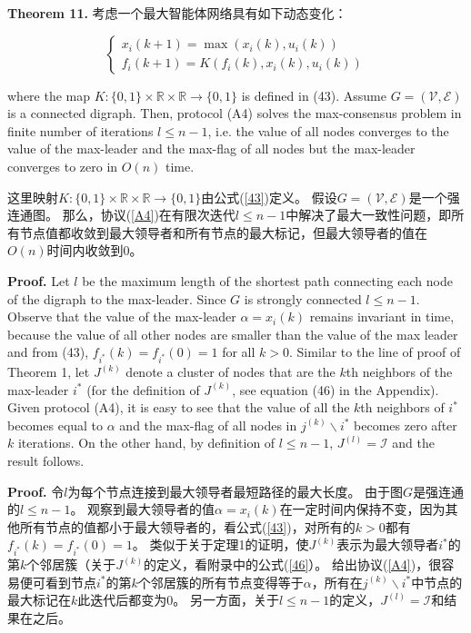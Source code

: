 \documentclass{article}
\begin{document}
\noindent\textbf{Theorem 11.} 考虑一个最大智能体网络具有如下动态变化：

\begin{equation}
    \tag{44}
    \label{44}
    \left\{
        \begin{matrix}
            x_i(k+1) = \max(x_i(k),u_i(k))\\
            f_i(k+1) = K(f_i(k),x_i(k),u_i(k))
        \end{matrix}
    \right.
\end{equation}

{\color[gray]{0.5}
\noindent where the map $K:\{0,1\}\times \mathbb{R}\times\mathbb{R}\rightarrow\{0,1\}$ is deﬁned in (43). 
Assume $G=(\mathcal{V},\mathcal{E})$ is a connected digraph. 
Then, protocol (A4) solves the max-consensus problem in finite number of iterations $l\le n-1$, i.e. the value of all nodes converges to the value of the max-leader and the max-flag of all nodes but the max-leader converges to zero in $O(n)$ time. 
}

\noindent 这里映射$K:\{0,1\}\times \mathbb{R}\times\mathbb{R}\rightarrow\{0,1\}$由公式(\ref{43})定义。
假设$G=(\mathcal{V},\mathcal{E})$是一个强连通图。
那么，协议(\ref{A4})在有限次迭代$l\le n-1$中解决了最大一致性问题，即所有节点值都收敛到最大领导者和所有节点的最大标记，但最大领导者的值在$O(n)$时间内收敛到0。

{\color[gray]{0.5}
\noindent\textbf{Proof.} Let $l$ be the maximum length of the shortest path connecting each node of the digraph to the max-leader. 
Since $G$ is strongly connected $l\le n-1$. 
Observe that the value of the max-leader $\alpha=x_i(k)$ remains invariant in time, because the value of all other nodes are smaller than the value of the max leader and from (43), $f_{i^*}(k)=f_{i^*}(0)=1$ for all $k > 0$. 
Similar to the line of proof of Theorem 1, let $J^{(k)}$ denote a cluster of nodes that are the $k$th neighbors of the max-leader $i^*$ (for the deﬁnition of $J^{(k)}$, see equation (46) in the Appendix). 
Given protocol (A4), it is easy to see that the value of all the $k$th neighbors of $i^*$ becomes equal to $\alpha$ and the max-ﬂag of all nodes in $j^{(k)}\backslash {i^*}$ becomes zero after $k$ iterations. 
On the other hand, by deﬁnition of $l\le n-1$, $J^{(l)}=\mathcal{I}$ and the result follows.
}

\noindent\textbf{Proof.} 令$l$为每个节点连接到最大领导者最短路径的最大长度。
由于图$G$是强连通的$l\le n-1$。
观察到最大领导者的值$\alpha=x_i(k)$在一定时间内保持不变，因为其他所有节点的值都小于最大领导者的，看公式(\ref{43})，对所有的$k>0$都有$f_{i^*}(k)=f_{i^*}(0)=1$。
类似于关于定理1的证明，使$J^{(k)}$表示为最大领导者$i^*$的第$k$个邻居簇（关于$J^{(k)}$的定义，看附录中的公式(\ref{46}）。
给出协议(\ref{A4})，很容易便可看到节点$i^*$的第$k$个邻居簇的所有节点变得等于$\alpha$，所有在$j^{(k)}\backslash {i^*}$中节点的最大标记在$k$此迭代后都变为0。
另一方面，关于$l\le n-1$的定义，$J^{(l)}=\mathcal{I}$和结果在之后。
\end{document}
